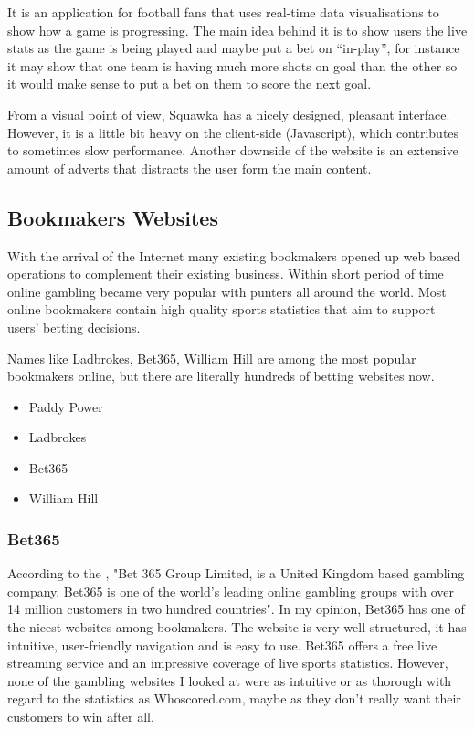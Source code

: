 It is an application for football fans that uses real-time data visualisations to show how a game is progressing. The main idea behind it is to show users the live stats as the game is being played and maybe put a bet on “in-play”, for instance it may show that one team is having much more shots on goal than the other so it would make sense to put a bet on them to score the next goal.

From a visual point of view, Squawka has a nicely designed, pleasant interface. However, it is a little bit heavy on the client-side (Javascript), which contributes to sometimes slow performance. Another downside of the website is an extensive amount of adverts that distracts the user form the main content.
	
\subsection{Bookmakers Websites}
\label{subsec:bookmakerswebsites_req}
	
With the arrival of the Internet many existing bookmakers opened up web based operations to complement their existing business. Within short period of time online gambling became very popular with punters all around the world. Most online bookmakers contain high quality sports statistics that aim to support users' betting decisions.

Names like Ladbrokes, Bet365, William Hill are among the most popular bookmakers online, but there are literally hundreds of betting websites now. 
\begin{itemize}
	\item Paddy Power \citep{source:paddypower}
	\item Ladbrokes \citep{source:ladbrokes}
	\item Bet365 \citep{source:bet365}
	\item William Hill \citep{source:williamhill}
\end{itemize}

\subsubsection{Bet365}
\label{susubsec:bet365}

According to the \citet{wiki:bet365}, "Bet 365 Group Limited, is a United Kingdom based gambling company. Bet365 is one of the world’s leading online gambling groups with over 14 million customers in two hundred countries". In my opinion, Bet365 has one of the nicest websites among bookmakers. The website is very well structured, it has intuitive, user-friendly navigation and is easy to use. Bet365 offers a free live streaming service and an impressive coverage of live sports statistics. However, none of the gambling websites I looked at were as intuitive or as thorough with regard to the statistics as Whoscored.com, maybe as they don’t really want their customers to win after all.

